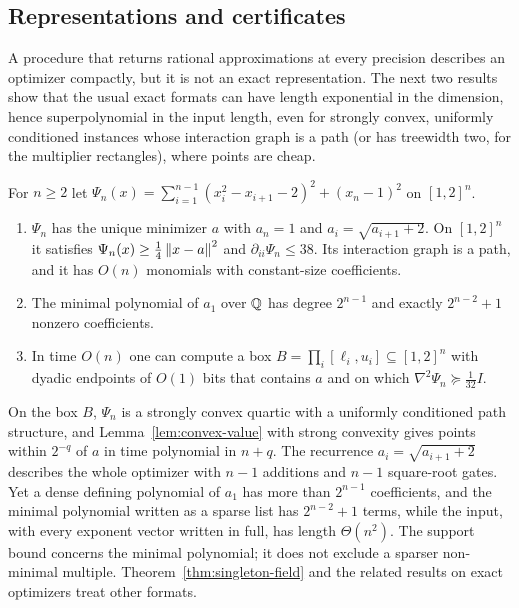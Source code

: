 \subsection{Representations and certificates}\label{sec:points-representation}

A procedure that returns rational approximations at every precision
describes an optimizer compactly, but it is not an exact representation. The
next two results show that the usual exact formats can have length
exponential in the dimension, hence superpolynomial in the input length,
even for strongly convex, uniformly conditioned instances whose interaction
graph is a path (or has treewidth two, for the multiplier rectangles), where
points are cheap.

\begin{proposition}\label{prop:points-algebraic-output}
For $n\ge2$ let
$\Psi_n(x)=\sum_{i=1}^{n-1}(x_i^2-x_{i+1}-2)^2+(x_n-1)^2$ on $[1,2]^n$.
\begin{enumerate}[label=(\alph*)]
\item $\Psi_n$ has the unique minimizer $a$ with $a_n=1$ and
$a_i=\sqrt{a_{i+1}+2}$. On $[1,2]^n$ it satisfies
$\Psi_n(x)\ge\frac14\left\lVert x-a\right\rVert^2$ and $\partial_{ii}\Psi_n\le38$. Its
interaction graph is a path, and it has $O(n)$ monomials with constant-size
coefficients.
\item The minimal polynomial of $a_1$ over $\mathbb Q$ has degree $2^{n-1}$ and
exactly $2^{n-2}+1$ nonzero coefficients.
\item In time $O(n)$ one can compute a box $B=\prod_i[\ell_i,u_i]\subseteq
[1,2]^n$ with dyadic endpoints of $O(1)$ bits that contains $a$ and on which
$\nabla^2\Psi_n\succeq\frac1{32}I$.
\end{enumerate}
\end{proposition}

On the box $B$, $\Psi_n$ is a strongly convex quartic with a uniformly
conditioned path structure, and Lemma~\ref{lem:convex-value} with strong
convexity gives points within $2^{-q}$ of $a$ in time polynomial in $n+q$.
The recurrence $a_i=\sqrt{a_{i+1}+2}$ describes the whole optimizer with
$n-1$ additions and $n-1$ square-root gates. Yet a dense defining polynomial
of $a_1$ has more than $2^{n-1}$ coefficients, and the minimal polynomial
written as a sparse list has $2^{n-2}+1$ terms, while the input, with every
exponent vector written in full, has length $\Theta(n^2)$. The support bound
concerns the minimal polynomial; it does not exclude a sparser
non-minimal multiple. Theorem~\ref{thm:singleton-field} and the related
results on exact optimizers treat other formats.

